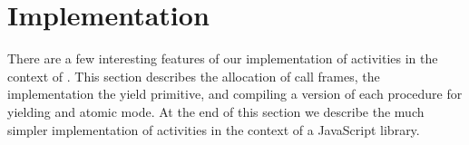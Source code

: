 \documentclass[a4paper,UKenglish,cleveref, autoref]{lipics-v2019}
\begin{document}




\section{Implementation}

There are a few interesting features of our implementation of activities in the context of \charcoal{}.
This section describes the allocation of call frames, the implementation the yield primitive, and compiling a version of each procedure for yielding and atomic mode.
At the end of this section we describe the much simpler implementation of activities in the context of a JavaScript library.
\end{document}
